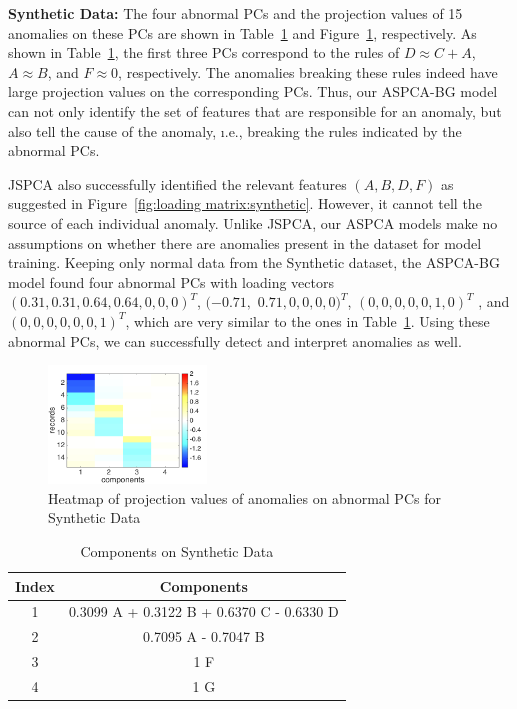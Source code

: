 {\bf Synthetic Data:}
The four abnormal PCs and the projection values of 15 anomalies on these PCs are shown in Table~\ref{table:components:synthetic} and Figure~\ref{fig:heatmap:synthetic}, respectively. As shown in Table~\ref{table:components:synthetic}, the first three PCs correspond to the rules of $D \approx C + A$, $A \approx B$,  and $F \approx 0$, respectively. The anomalies breaking these rules indeed have large projection values on the corresponding PCs. Thus, our ASPCA-BG model can not only identify the set of
features that are responsible for an anomaly, but also tell the cause of the anomaly, \i.e., breaking the rules indicated by the abnormal PCs.

JSPCA also successfully identified the relevant features $(A, B, D, F)$ as suggested in Figure~\ref{fig:loading matrix:synthetic}. However, it cannot tell the source of each individual anomaly. Unlike JSPCA, our ASPCA models make no assumptions on whether there are anomalies present in the dataset for model training. Keeping only normal data from the Synthetic dataset,  the ASPCA-BG model found four abnormal PCs with loading vectors $(0.31, 0.31, 0.64, 0.64, 0, 0, 0)^T$, $(-0.71,$  $0.71, 0, 0, 0, 0)^T$, $(0, 0, 0, 0, 0, 1, 0)^T$ , and $(0, 0, 0, 0, 0, 0, 1)^T$, which are very similar to the ones in Table~\ref{table:components:synthetic}. Using these abnormal PCs, we can successfully detect and interpret anomalies as well.

\begin{figure}
\centering
	\includegraphics[width=42mm]{figure/new/Synthetic-heat-map}
\caption{Heatmap of projection values of anomalies on abnormal PCs for Synthetic Data}
\label{fig:heatmap:synthetic}
\end{figure}

\begin{table}
\centering
\caption{Components on Synthetic Data}
\label{table:components:synthetic}
\small
\begin{tabular}{|c|c|}
\hline
Index & Components \\ \hline
1 & 0.3099 A + 0.3122 B + 0.6370 C - 0.6330 D \\
2 & 0.7095 A - 0.7047 B\\
3 & 1 F\\
4 & 1 G\\
\hline
\end{tabular}
\end{table}

